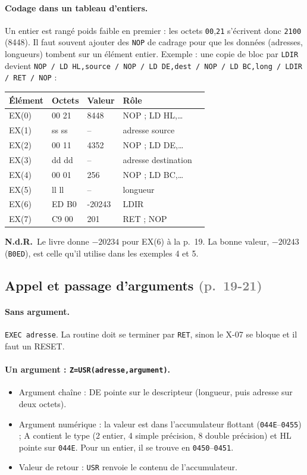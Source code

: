 \documentclass[a4paper,10pt]{article}
\newcommand{\hex}[1]{\texttt{#1}}
\newcommand{\reg}[1]{\textsf{#1}}
\newcommand{\pg}[1]{\texorpdfstring{\textcolor{gray}{\small(p.~#1)}}{}}
\newcommand{\nota}[1]{\textcolor{red!60!black}{\small\textbf{N.d.R.}~#1}}
\begin{document}
\paragraph{Codage dans un tableau d'entiers.} Un entier est rangé poids faible
en premier : les octets \hex{00},\hex{21} s'écrivent donc \hex{2100}
(8448). Il faut souvent ajouter des \texttt{NOP} de cadrage pour que les
données (adresses, longueurs) tombent sur un élément entier. Exemple : une
copie de bloc par \texttt{LDIR} devient
\texttt{NOP / LD HL,source / NOP / LD DE,dest / NOP / LD BC,long / LDIR / RET / NOP} :
\begin{center}\small\ttfamily
\begin{tabular}{@{}lllll@{}}
\toprule
\normalfont Élément & \normalfont Octets & \normalfont Valeur & \normalfont Rôle \\
\midrule
EX(0) & 00 21 & 8448 & NOP ; LD HL,\dots \\
EX(1) & ss ss & -- & adresse source \\
EX(2) & 00 11 & 4352 & NOP ; LD DE,\dots \\
EX(3) & dd dd & -- & adresse destination \\
EX(4) & 00 01 & 256 & NOP ; LD BC,\dots \\
EX(5) & ll ll & -- & longueur \\
EX(6) & ED B0 & -20243 & LDIR \\
EX(7) & C9 00 & 201 & RET ; NOP \\
\bottomrule
\end{tabular}
\end{center}
\nota{Le livre donne $-20234$ pour EX(6) à la p.~19. La bonne valeur,
$-20243$ (\hex{B0ED}), est celle qu'il utilise dans les exemples 4 et 5.}

\subsection{Appel et passage d'arguments \pg{19-21}}

\paragraph{Sans argument.} \texttt{EXEC adresse}. La routine doit se
terminer par \texttt{RET}, sinon le X-07 se bloque et il faut un RESET.

\paragraph{Un argument : \texttt{Z=USR(adresse,argument)}.}
\begin{itemize}
  \item Argument chaîne : \reg{DE} pointe sur le descripteur (longueur, puis
        adresse sur deux octets).
  \item Argument numérique : la valeur est dans l'accumulateur flottant
        (\hex{044E}--\hex{0455}) ; \reg{A} contient le type (2 entier,
        4 simple précision, 8 double précision) et \reg{HL} pointe sur
        \hex{044E}. Pour un entier, il se trouve en \hex{0450}--\hex{0451}.
  \item Valeur de retour : \texttt{USR} renvoie le contenu de
        l'accumulateur.
\end{itemize}
\end{document}
